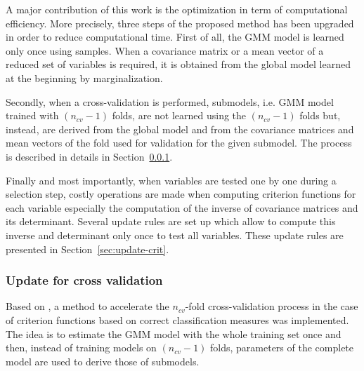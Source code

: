 \documentclass[journal,peerreview,onecolumn]{IEEEtran}
\begin{document}
    A major contribution of this work is the optimization in term of computational efficiency. More precisely, three steps of the proposed method has been upgraded in order to reduce computational time. First of all, the GMM model is learned only once using samples. When a covariance matrix or a mean vector of a reduced set of variables is required, it is obtained from the global model learned at the beginning by marginalization.

    Secondly, when a cross-validation is performed, submodels, i.e. GMM model trained with $(n_{cv}-1)$ folds, are not learned using the $(n_{cv}-1)$ folds but, instead, are derived from the global model and from the covariance matrices and mean vectors of the fold used for validation for the given submodel. The process is described in details in Section~\ref{sec:update-cv}.

    Finally and most importantly, when variables are tested one by one during a selection step, costly operations are made when computing criterion functions for each variable especially the computation of the inverse of covariance matrices and its determinant. Several update rules are set up which allow to compute this inverse and determinant only once to test all variables. These update rules are presented in Section~\ref{sec:update-crit}.

        \subsubsection{Update for cross validation}
        \label{sec:update-cv}

        Based on \cite{fauvel2015fast}, a method to accelerate the $n_{cv}$-fold cross-validation process in the case of criterion functions based on correct classification measures was implemented. The idea is to estimate the GMM model with the whole training set once and then, instead of training models on $(n_{cv}-1)$ folds, parameters of the complete model are used to derive those of submodels.
\end{document}
